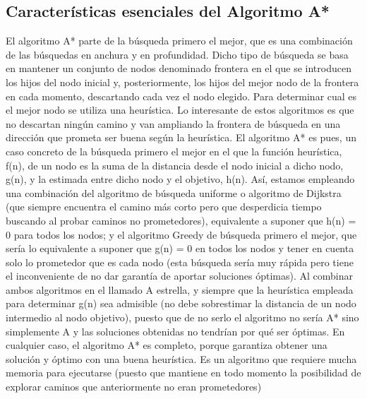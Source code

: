 \documentclass[a4paper, 11pt]{article}
\begin{document}
\subsection{Características esenciales del Algoritmo A*}
El algoritmo A* parte de la búsqueda primero el mejor, que es una combinación de las búsquedas en anchura y en profundidad. Dicho tipo de búsqueda se basa en mantener un conjunto de nodos denominado frontera en el que se introducen los hijos del nodo inicial y, posteriormente, los hijos del mejor nodo de la frontera en cada momento, descartando cada vez el nodo elegido. Para determinar cual es el mejor nodo se utiliza una heurística. Lo interesante de estos algoritmos es que no descartan ningún camino y van ampliando la frontera de búsqueda en una dirección que prometa ser buena según la heurística. 
El algoritmo A* es pues, un caso concreto de la búsqueda primero el mejor en el que la función heurística, f(n), de un nodo es la suma de la distancia desde el nodo inicial a dicho nodo, g(n), y la estimada entre dicho nodo y el objetivo, h(n). Así, estamos empleando una combinación del algoritmo de búsqueda uniforme o algoritmo de Dijkstra (que siempre encuentra el camino más corto pero que desperdicia tiempo buscando al probar caminos no prometedores), equivalente a suponer que h(n) = 0 para todos los nodos; y el algoritmo Greedy de búsqueda primero el mejor, que sería lo equivalente a suponer que g(n) = 0 en todos los nodos y tener en cuenta solo lo prometedor que es cada nodo (esta búsqueda sería muy rápida pero tiene el inconveniente de no dar garantía de aportar soluciones óptimas). Al combinar ambos algoritmos en el llamado A estrella, y siempre que la heurística empleada para determinar g(n) sea admisible (no debe sobrestimar la distancia de un nodo intermedio al nodo objetivo), puesto que de no serlo el algoritmo no sería A* sino simplemente A y las soluciones obtenidas no tendrían por qué ser óptimas. En cualquier caso, el algoritmo A* es completo, porque garantiza obtener una solución y óptimo con una buena heurística. Es un algoritmo que requiere mucha memoria para ejecutarse (puesto que mantiene en todo momento la posibilidad de explorar caminos que anteriormente no eran prometedores)
\end{document}
